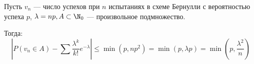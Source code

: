 \documentclass[12pt, a4paper, oneside]{book}
\begin{document}
\begin{theorem}
    Пусть \(v_n\) --- число успехов при \(n\) испытаниях в схеме Бернулли с вероятностью успеха \(p\), \(\lambda = np, A \subset \N_0\) --- произвольное подмножество.

    Тогда:
    \[\left|P(v_n\in A) - \sum \frac{\lambda^k}{k!} e^{ - \lambda}\right| \leq \min (p, np^2) = \min (p, \lambda p) = \min\left(p, \frac{\lambda^2}{n}\right)\]
\end{theorem}
\end{document}
